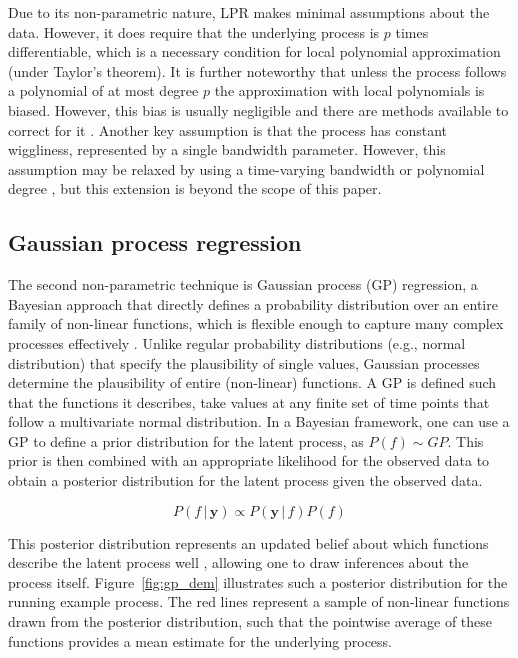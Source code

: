 \documentclass[man, floatsintext]{apa7}
\begin{document}
Due to its non-parametric nature, LPR makes minimal assumptions about the data.
However, it does require that the underlying process is $p$ times
differentiable, which is a necessary condition for local polynomial
approximation (under Taylor's theorem). It is further noteworthy
that unless the process follows a polynomial of at most degree $p$ the
approximation with local polynomials is biased. However, this bias is usually
negligible and there are methods available to correct for it
\parencite{R-nprobust}. Another key assumption is that the process has constant
wiggliness, represented by a single bandwidth parameter. However, this
assumption may be relaxed by using a time-varying bandwidth
\parencite{fan_data-driven_1995} or polynomial degree
\parencite{fan_adaptive_1995}, but this extension is beyond the scope of this
paper.

\subsection{Gaussian process regression}

The second non-parametric technique is Gaussian process (GP) regression, a
Bayesian approach that directly defines a probability distribution over an
entire family of non-linear functions, which is flexible enough to capture many
complex processes effectively \parencite{rasmussen_gaussian_2006,
  betancourt_robust_2020, roberts_gaussian_2013}. Unlike regular probability
distributions (e.g., normal distribution) that specify the plausibility of
single values, Gaussian processes determine the plausibility of entire
(non-linear)  functions. A GP is defined such that the functions it describes,
take values at any finite set of time points that follow a multivariate normal
distribution. In a Bayesian framework, one can use a GP to define a prior
distribution for the latent process, as $P(f) \sim GP$. This prior is then
combined with an appropriate likelihood for the observed data to obtain a
posterior distribution for the latent process given the observed data.

\begin{equation}
  P(f \, | \, \textbf{y})  \propto P(\textbf{y} \, | \, f) P(f)
\end{equation}

\noindent This posterior distribution represents an updated belief about which
functions describe the latent process well \parencite{kruschke_doing_2011},
allowing one to draw inferences about the process itself.
Figure~\ref{fig:gp_dem} illustrates such a posterior distribution for the
running example process. The red lines represent a sample of non-linear
functions drawn from the posterior distribution, such that the pointwise
average of these functions provides a mean estimate for the underlying process.
\end{document}
